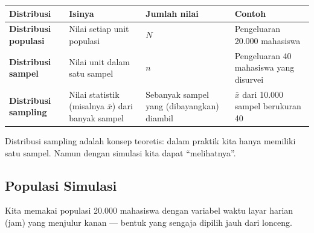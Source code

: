 \documentclass[
  indonesian,
  letterpaper,
]{book}
\newcounter{none} %
\begin{document}
{\def\LTcaptype{none} %
\begin{longtable}[]{@{}
  >{\raggedright\arraybackslash}p{}
  >{\raggedright\arraybackslash}p{}
  >{\raggedright\arraybackslash}p{}
  >{\raggedright\arraybackslash}p{}@{}}
\toprule\noalign{}
\begin{minipage}[b]{\linewidth}\raggedright
Distribusi
\end{minipage} & \begin{minipage}[b]{\linewidth}\raggedright
Isinya
\end{minipage} & \begin{minipage}[b]{\linewidth}\raggedright
Jumlah nilai
\end{minipage} & \begin{minipage}[b]{\linewidth}\raggedright
Contoh
\end{minipage} \\
\midrule\noalign{}
\endhead
\bottomrule\noalign{}
\endlastfoot
\textbf{Distribusi populasi} & Nilai setiap unit populasi & \(N\) &
Pengeluaran 20.000 mahasiswa \\
\textbf{Distribusi sampel} & Nilai unit dalam satu sampel & \(n\) &
Pengeluaran 40 mahasiswa yang disurvei \\
\textbf{Distribusi sampling} & Nilai statistik (misalnya \(\bar{x}\))
dari banyak sampel & Sebanyak sampel yang (dibayangkan) diambil &
\(\bar{x}\) dari 10.000 sampel berukuran 40 \\
\end{longtable}
}

Distribusi sampling adalah konsep teoretis: dalam praktik kita hanya
memiliki satu sampel. Namun dengan simulasi kita dapat ``melihatnya''.

\subsection{Populasi Simulasi}\label{populasi-simulasi-1}

Kita memakai populasi 20.000 mahasiswa dengan variabel waktu layar
harian (jam) yang menjulur kanan --- bentuk yang sengaja dipilih jauh
dari lonceng.
\end{document}
